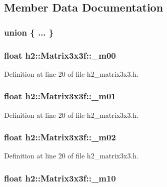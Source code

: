 \subsection{Member Data Documentation}
\hypertarget{classh2_1_1_matrix3x3f_a0c142de08627edb6e20fc13edee62258}{\subsubsection[{"@5}]{\setlength{\rightskip}{0pt plus 5cm}union \{ ... \} }}\label{classh2_1_1_matrix3x3f_a0c142de08627edb6e20fc13edee62258}
\hypertarget{classh2_1_1_matrix3x3f_a804ba4cefdf8b57c96bd10b547274b85}{
\subsubsection[{\-\_\-m00}]{\setlength{\rightskip}{0pt plus 5cm}float h2\-::\-Matrix3x3f\-::\-\_\-m00}}\label{classh2_1_1_matrix3x3f_a804ba4cefdf8b57c96bd10b547274b85}


Definition at line 20 of file h2\-\_\-matrix3x3.\-h.

\hypertarget{classh2_1_1_matrix3x3f_a9ac0a0fdec4ff38f2011eeeb0eec366c}{
\subsubsection[{\-\_\-m01}]{\setlength{\rightskip}{0pt plus 5cm}float h2\-::\-Matrix3x3f\-::\-\_\-m01}}\label{classh2_1_1_matrix3x3f_a9ac0a0fdec4ff38f2011eeeb0eec366c}


Definition at line 20 of file h2\-\_\-matrix3x3.\-h.

\hypertarget{classh2_1_1_matrix3x3f_ab222ab67b315e9bd3740707bdb2bb244}{
\subsubsection[{\-\_\-m02}]{\setlength{\rightskip}{0pt plus 5cm}float h2\-::\-Matrix3x3f\-::\-\_\-m02}}\label{classh2_1_1_matrix3x3f_ab222ab67b315e9bd3740707bdb2bb244}


Definition at line 20 of file h2\-\_\-matrix3x3.\-h.

\hypertarget{classh2_1_1_matrix3x3f_a0f0826127f2c70fb178fd76b85ed98de}{
\subsubsection[{\-\_\-m10}]{\setlength{\rightskip}{0pt plus 5cm}float h2\-::\-Matrix3x3f\-::\-\_\-m10}}\label{classh2_1_1_matrix3x3f_a0f0826127f2c70fb178fd76b85ed98de}



